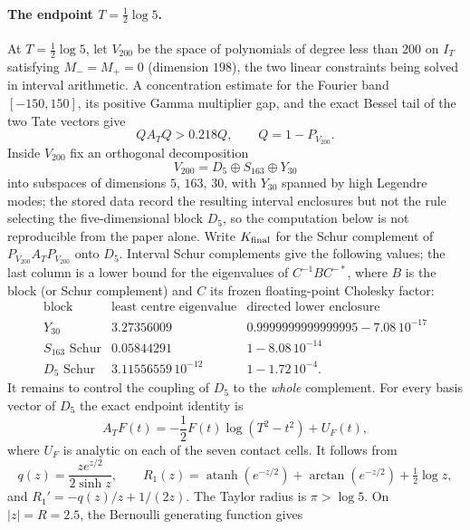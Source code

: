 \documentclass[11pt]{amsart}
\theoremstyle{definition}
\theoremstyle{remark}
\begin{document}
\paragraph{The endpoint $T=\frac12\log5$.}
At \(T=\frac12\log5\), let \(V_{200}\) be the space of polynomials of
degree less than \(200\) on \(I_T\) satisfying \(M_-=M_+=0\) (dimension
\(198\)), the two linear constraints being solved in interval arithmetic.  A concentration estimate for the Fourier band \([-150,150]\), its
positive Gamma multiplier gap, and the exact Bessel tail of the two Tate
vectors give
\begin{equation}\label{eq:logfivecomplement}
 QA_TQ>0.218Q,\qquad Q=1-P_{V_{200}}.
\end{equation}
Inside \(V_{200}\) fix an orthogonal decomposition
\[
 V_{200}=D_5\oplus S_{163}\oplus Y_{30}
\]
into subspaces of dimensions \(5\), \(163\), \(30\), with \(Y_{30}\) spanned
by high Legendre modes; the stored data record the resulting interval
enclosures but not the rule selecting the five-dimensional block \(D_5\),
so the computation below is not reproducible from the paper alone.  Write
\(K_{\rm final}\) for the Schur complement of \(P_{V_{200}}A_TP_{V_{200}}\)
onto \(D_5\).
Interval Schur complements give the following values; the last column is a
lower bound for the eigenvalues of \(C^{-1}BC^{-*}\), where \(B\) is the
block (or Schur complement) and \(C\) its frozen floating-point Cholesky
factor:
\[
\begin{array}{c|c|c}
\text{block}&\text{least centre eigenvalue}&
              \text{directed lower enclosure}\\ \hline
Y_{30}&3.27356009&0.9999999999999995-7.08\,10^{-17}\\
S_{163}\text{ Schur}&0.05844291&1-8.08\,10^{-14}\\
D_5\text{ Schur}&3.11556559\,10^{-12}&1-1.72\,10^{-4}.
\end{array}
\]
It remains to control the coupling of \(D_5\) to the \emph{whole}
complement.  For every basis vector of \(D_5\) the exact
endpoint identity is
\begin{equation}\label{eq:endpointlogidentity}
 A_TF(t)=-\frac12F(t)\log(T^2-t^2)+U_F(t),
\end{equation}
where \(U_F\) is analytic on each of the seven contact cells.  It follows
from
\[
 q(z)=\frac{ze^{z/2}}{2\sinh z},\qquad
 R_1(z)=\operatorname{atanh}(e^{-z/2})+
        \arctan(e^{-z/2})+\tfrac12\log z,
\]
and \(R_1'=-q(z)/z+1/(2z)\).  The Taylor radius is \(\pi>\log5\).
On \(|z|=R=2.5\), the Bernoulli generating function gives
\end{document}
